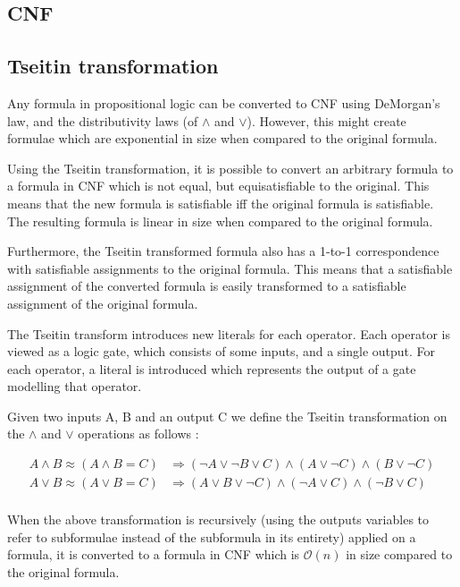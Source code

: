 \documentclass[a4paper]{article}
\begin{document}
\subsection{CNF}
\subsection{Tseitin transformation}
Any formula in propositional logic can be converted to CNF using DeMorgan's law, and the distributivity laws (of $\land$ and $\lor$). However, this might create formulae which are exponential in size when compared to the original formula.

Using the Tseitin transformation, it is possible to convert an arbitrary formula to a formula in CNF which is not equal, but equisatisfiable to the original. This means that the new formula is satisfiable iff the original formula is satisfiable. The resulting formula is linear in size when compared to the original formula.

Furthermore, the Tseitin transformed formula also has a 1-to-1 correspondence with satisfiable assignments to the original formula. This means that a satisfiable assignment of the converted formula is easily transformed to a satisfiable assignment of the original formula.

The Tseitin transform introduces new literals for each operator. Each operator is viewed as a logic gate, which consists of some inputs, and a single output. For each operator, a literal is introduced which represents the output of a gate modelling that operator.

Given two inputs A, B and an output C we define the Tseitin transformation on the $\land$ and $\lor$ operations as follows \cite{Wikipedia2015}:

\begin{align*}
A \land B \approx (A \land B = C) &\Rightarrow (\lnot A \lor \lnot B \lor C) \land (A \lor \lnot C) \land (B \lor \lnot C)\\
A \lor B \approx (A \lor B = C) &\Rightarrow (A \lor B \lor \lnot C) \land (\lnot A \lor  C) \land (\lnot B \lor   C)\\
\end{align*}

When the above transformation is recursively (using the outputs variables to refer to subformulae instead of the subformula in its entirety) applied on a formula, it is converted to a formula in CNF which is $\mathcal{O}(n)$ in size compared to the original formula.
\end{document}
